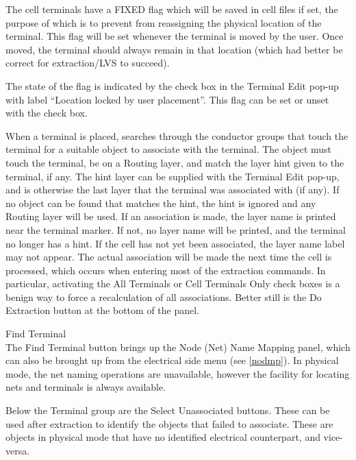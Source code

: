 \begin{description}
The cell terminals have a {\vt FIXED} flag which will be saved in
cell files if set, the purpose of which is to prevent {\Xic} from
reassigning the physical location of the terminal.  This flag will be
set whenever the terminal is moved by the user.  Once moved, the
terminal should always remain in that location (which had better be
correct for extraction/LVS to succeed).

The state of the flag is indicated by the check box in the {\cb Terminal
Edit} pop-up with label ``Location locked by user placement''. 
This flag can be set or unset with the check box.

When a terminal is placed, {\Xic} searches through the conductor
groups that touch the terminal for a suitable object to associate with
the terminal.  The object must touch the terminal, be on a {\et
Routing} layer, and match the layer hint given to the terminal, if
any.  The hint layer can be supplied with the {\cb Terminal Edit}
pop-up, and is otherwise the last layer that the terminal was
associated with (if any).  If no object can be found that matches the
hint, the hint is ignored and any {\et Routing} layer will be used. 
If an association is made, the layer name is printed near the terminal
marker.  If not, no layer name will be printed, and the terminal no
longer has a hint.  If the cell has not yet been associated, the layer
name label may not appear.  The actual association will be made the
next time the cell is processed, which occurs when entering most of
the extraction commands.  In particular, activating the {\et All
Terminals} or {\cb Cell Terminals Only} check boxes is a benign way to
force a recalculation of all associations.  Better still is the {\cb
Do Extraction} button at the bottom of the panel.

\item{\cb Find Terminal}\\
The {\cb Find Terminal} button brings up the {\cb Node (Net) Name
Mapping} panel, which can also be brought up from the electrical side
menu (see \ref{nodmp}).  In physical mode, the net naming operations
are unavailable, however the facility for locating nets and terminals
is always available.
\end{description}

Below the {\cb Terminal} group are the {\cb Select Unassociated}
buttons.  These can be used after extraction to identify the objects
that failed to associate.  These are objects in physical mode that
have no identified electrical counterpart, and vice-versa.

